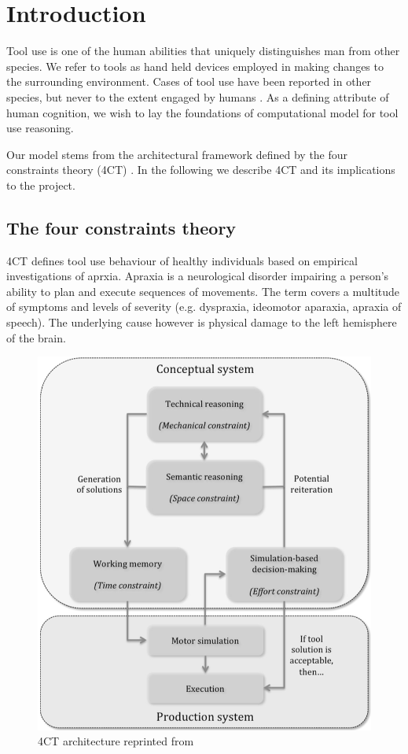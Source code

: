 \documentclass[11]{article}
\begin{document}
\section{Introduction}
Tool use is one of the human abilities that uniquely distinguishes man from other species. 
We refer to tools as hand held devices employed in making changes to the surrounding environment. 
Cases of tool use have been reported in other species, but never to the extent engaged by humans \cite{boysen1999,harrington2009,lefebvre2004}. 
As a defining attribute of human cognition, we wish to lay the foundations of computational model for tool use reasoning.

Our model stems from the architectural framework defined by the four constraints theory (4CT) \cite{osiurak2014a}.
In the following we describe 4CT and its implications to the project.  

\subsection{The four constraints theory}
4CT defines tool use behaviour of healthy individuals based on empirical investigations of aprxia.
Apraxia is a neurological disorder impairing a person's ability to plan and execute sequences of movements.
The term covers a multitude of symptoms and levels of severity (e.g. dyspraxia, ideomotor aparaxia, apraxia of speech).
The underlying cause however is physical damage to the left hemisphere of the brain\cite{osiurak2013}.

\begin{figure}[h]
  \centering
  \includegraphics[width=.9\textwidth]{figures/4CTArchitecture.png}
  \caption{4CT architecture reprinted from \cite{osiurak2014a}}
  \label{fig:4CTArchitecture}
\end{figure}      
\end{document}
